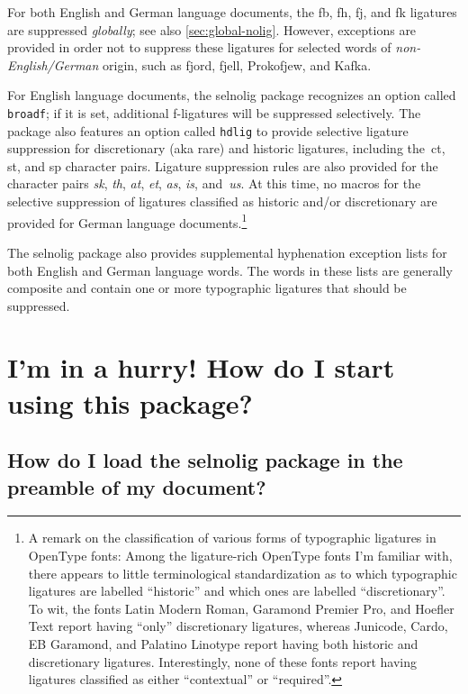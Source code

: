 \documentclass[11pt]{article}
\newcommand{\pkg}[1]{\textsf{#1}}
\newcommand{\opt}[1]{\texttt{#1}}
\begin{document}
For both English and German language documents, the {\ebg \mbox{fb}, \mbox{fh}, \mbox{fj}, and \mbox{fk}} ligatures are suppressed \emph{globally}; see also \cref{sec:global-nolig}. However, exceptions are provided in order not to suppress these ligatures for selected words of \emph{non-English\slash German} origin, such as {\ebg fjord, fjell, Prokofjew, and Kafka}.

For English language documents, the \pkg{selnolig} package recognizes an option called \opt{broadf}; if it is set, additional f-ligatures will be suppressed selectively. The package also features an option called \opt{hdlig} to provide selective ligature suppression for discretionary (aka rare) and historic ligatures, including the~ct, st, and sp character pairs. Ligature suppression rules are also provided for the character pairs {\ebg\emph{sk}}, \emph{th}, \emph{at}, \emph{et}, \emph{as}, \emph{is}, and~\emph{us}. At this time, no macros for the selective suppression of ligatures classified as historic and/or discretionary are provided for German language documents.\footnote{A remark on the classification of various forms of typographic ligatures in OpenType fonts: Among the ligature-rich OpenType fonts I'm familiar with, there appears to little terminological standardization as to which typographic ligatures are labelled \enquote{historic} and which ones are labelled \enquote{discretionary}. To wit, the fonts Latin Modern Roman, Garamond Premier Pro, and Hoefler Text report having \enquote{only} discretionary ligatures, whereas Junicode, Cardo, EB Garamond, and Palatino Linotype report having both historic and discretionary ligatures. Interestingly, none of these fonts report having ligatures classified as either \enquote{contextual} or \enquote{required}. }

The \pkg{selnolig} package also provides supplemental hyphenation exception lists for both English and German language words. The words in these lists are generally composite and contain one or more typographic ligatures that should be suppressed.





\section{I'm in a hurry! How do I start using this package?}

\subsection[How do I load the selnolig package?]{How do I load the \pkg{selnolig} package in the preamble of my document?}
\end{document}
